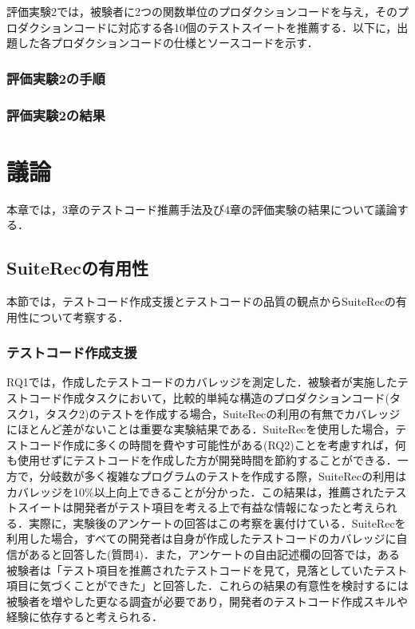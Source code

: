\documentclass[12pt]{jarticle} %
\begin{document}
評価実験2では，被験者に2つの関数単位のプロダクションコードを与え，そのプロダクションコードに対応する各10個のテストスイートを推薦する．以下に，出題した各プロダクションコードの仕様とソースコードを示す．



\subsubsection{評価実験2の手順}
\subsubsection{評価実験2の結果}

\newpage
\section{議論}

本章では，3章のテストコード推薦手法及び4章の評価実験の結果について議論する．

\subsection{SuiteRecの有用性}
本節では，テストコード作成支援とテストコードの品質の観点から{\sf SuiteRec}の有用性について考察する．

\subsubsection{テストコード作成支援}
RQ1では，作成したテストコードのカバレッジを測定した．被験者が実施したテストコード作成タスクにおいて，比較的単純な構造のプロダクションコード(タスク1，タスク2)のテストを作成する場合，{\sf SuiteRec}の利用の有無でカバレッジにほとんど差がないことは重要な実験結果である．{\sf SuiteRec}を使用した場合，テストコード作成に多くの時間を費やす可能性がある(RQ2)ことを考慮すれば，何も使用せずにテストコードを作成した方が開発時間を節約することができる．一方で，分岐数が多く複雑なプログラムのテストを作成する際，{\sf SuiteRec}の利用はカバレッジを10\%以上向上できることが分かった．この結果は，推薦されたテストスイートは開発者がテスト項目を考える上で有益な情報になったと考えられる．実際に，実験後のアンケートの回答はこの考察を裏付けている．{\sf SuiteRec}を利用した場合，すべての開発者は自身が作成したテストコードのカバレッジに自信があると回答した(質問4)．また，アンケートの自由記述欄の回答では，ある被験者は「テスト項目を推薦されたテストコードを見て，見落としていたテスト項目に気づくことができた」と回答した．これらの結果の有意性を検討するには被験者を増やした更なる調査が必要であり，開発者のテストコード作成スキルや経験に依存すると考えられる．
\end{document}
